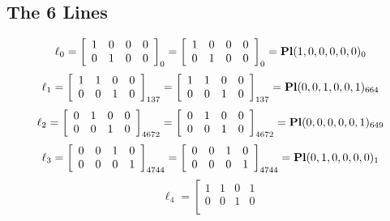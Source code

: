 \documentclass{article}
\begin{document}
{\subsection*{The 6 Lines}
$$
\ell_{0} = 
\left[
\begin{array}{*{4}{r}}
1 & 0 & 0 & 0\\
0 & 1 & 0 & 0\\
\end{array}
\right]
_{0}
=
\left[
\begin{array}{*{4}c}
1  & 0  & 0  & 0\\
0  & 1  & 0  & 0\\
\end{array}
\right]_{0}
={\rm\bf Pl}(1,0,0,0,0,0 )_{0}$$
$$
\ell_{1} = 
\left[
\begin{array}{*{4}{r}}
1 & 1 & 0 & 0\\
0 & 0 & 1 & 0\\
\end{array}
\right]
_{137}
=
\left[
\begin{array}{*{4}c}
1  & 1  & 0  & 0\\
0  & 0  & 1  & 0\\
\end{array}
\right]_{137}
={\rm\bf Pl}(0,0,1,0,0,1 )_{664}$$
$$
\ell_{2} = 
\left[
\begin{array}{*{4}{r}}
0 & 1 & 0 & 0\\
0 & 0 & 1 & 0\\
\end{array}
\right]
_{4672}
=
\left[
\begin{array}{*{4}c}
0  & 1  & 0  & 0\\
0  & 0  & 1  & 0\\
\end{array}
\right]_{4672}
={\rm\bf Pl}(0,0,0,0,0,1 )_{649}$$
$$
\ell_{3} = 
\left[
\begin{array}{*{4}{r}}
0 & 0 & 1 & 0\\
0 & 0 & 0 & 1\\
\end{array}
\right]
_{4744}
=
\left[
\begin{array}{*{4}c}
0  & 0  & 1  & 0\\
0  & 0  & 0  & 1\\
\end{array}
\right]_{4744}
={\rm\bf Pl}(0,1,0,0,0,0 )_{1}$$
$$
\ell_{4} = 
\left[
\begin{array}{*{4}{r}}
1 & 1 & 0 & 1\\
0 & 0 & 1 & 0\\
\end{array}
$$}
\end{document}
